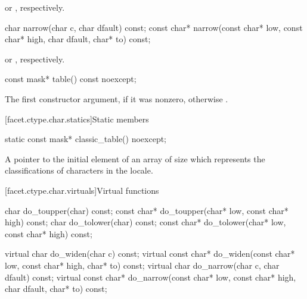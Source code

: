 \begin{itemdescr}
\pnum
\returns
{}
or
%
,
respectively.
\end{itemdescr}

%
\begin{itemdecl}
char        narrow(char c, char dfault) const;
const char* narrow(const char* low, const char* high, char dfault, char* to) const;
\end{itemdecl}

\begin{itemdescr}
\pnum
\returns
{}%
or
%
,
respectively.
\end{itemdescr}

%
\begin{itemdecl}
const mask* table() const noexcept;
\end{itemdecl}

\begin{itemdescr}
\pnum
\returns
The first constructor argument, if it was nonzero, otherwise
.
\end{itemdescr}

[facet.ctype.char.statics]{Static members}

%
\begin{itemdecl}
static const mask* classic_table() noexcept;
\end{itemdecl}

\begin{itemdescr}
\pnum
\returns
A pointer to the initial element of an array of size
which represents the classifications of characters in the  locale.
\end{itemdescr}

[facet.ctype.char.virtuals]{Virtual functions}

%
%
%
%
\begin{codeblock}
char        do_toupper(char) const;
const char* do_toupper(char* low, const char* high) const;
char        do_tolower(char) const;
const char* do_tolower(char* low, const char* high) const;

virtual char        do_widen(char c) const;
virtual const char* do_widen(const char* low, const char* high, char* to) const;
virtual char        do_narrow(char c, char dfault) const;
virtual const char* do_narrow(const char* low, const char* high,
                              char dfault, char* to) const;
\end{codeblock}


